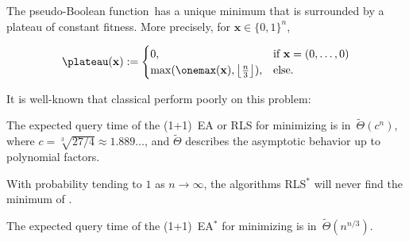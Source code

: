The pseudo-Boolean function~\plateau has a unique minimum that is surrounded by a plateau of constant fitness. More precisely, for $\mathbf{x}\in\{0,1\}^n$,

\begin{equation}
\plateau(\mathbf{x}):=\begin{cases}
0, & \text{if } \mathbf{x} = (0,\ldots,0)\\
\max(\onemax(\mathbf{x}),\left\lfloor   \frac{n}{3} \right\rfloor), & \text{else.}\end{cases}
\end{equation}

It is well-known that classical \rsh perform poorly on this problem:

\begin{theorem}\label{thm:plateauclassic}
The expected query time of the (1+1)~EA or RLS for minimizing \plateau is in~$\tilde{\Theta}(c^n)$, where $c = \sqrt[3]{27/4} \approx 1.889\ldots$, and $\tilde{\Theta}$ describes the asymptotic behavior up to polynomial factors.

With probability tending to $1$ as $n \to \infty$, the algorithms RLS$^*$ will never find the minimum of \plateau.

The expected query time of the (1+1)~EA$^*$ for minimizing \plateau is in~$\tilde{\Theta}(n^{n/3})$.
\end{theorem}
